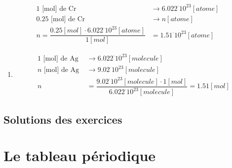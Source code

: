\documentclass[
  11pt,
  a4paper,
  openany]{book}
\providecommand{\tightlist}{%
  \setlength{\itemsep}{0pt}\setlength{\parskip}{0pt}}
\begin{document}
\begin{Answer}
\[ \begin{split}
  1 \text{ [mol] de Cr } &\longrightarrow 6.022^\cdot10^{23} [atome]\\
  0.25 \text{ [mol] de Cr } &\longrightarrow n [atome]\\
  n = \dfrac{0.25 [mol] \cdot 6.022^\cdot10^{23} [atome]}{1 [mol]} &= 1.51^\cdot10^{23} [atome]
  \end{split} \]

\begin{enumerate}
\def\labelenumi{\arabic{enumi}.}
\setcounter{enumi}{3}
\tightlist
\item
  \[ \begin{split}
       1 \text{ [mol] de Ag } &\longrightarrow 6.022^\cdot10^{23} [molecule]\\
       n \text{ [mol] de Ag } &\longrightarrow 9.02^\cdot10^{23} [molecule]\\
       n &= \dfrac{9.02^\cdot10^{23} [molecule] \cdot 1[mol]}{6.022^\cdot10^{23} [molecule]} = 1.51 [mol]
   \end{split} \]
\end{enumerate}

\end{Answer}

\newpage

\section{Solutions des exercices} \shipoutAnswer

\chapter{Le tableau périodique}\label{le-tableau-puxe9riodique}
\end{document}
